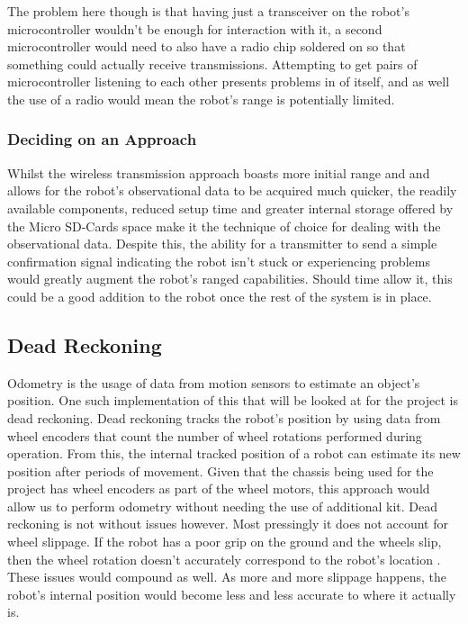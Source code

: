 					The problem here though is that having just a transceiver on the robot's microcontroller wouldn't be enough for interaction with it, a second microcontroller would need to also have a radio chip soldered on so that something could actually receive transmissions. Attempting to get pairs of microcontroller listening to each other presents problems in of itself, and as well the use of a radio would mean the robot's range is potentially limited.
					
					\subsubsection{Deciding on an Approach}
					Whilst the wireless transmission approach boasts more initial range and and allows for the robot's observational data to be acquired much quicker, the readily available components, reduced setup time and greater internal storage offered by the Micro SD-Cards space make it the technique of choice for dealing with the observational data. Despite this, the ability for a transmitter to send a simple confirmation signal indicating the robot isn't stuck or experiencing problems would greatly augment the robot's ranged capabilities. Should time allow it, this could be a good addition to the robot once the rest of the system is in place.
				
				\subsection{Dead Reckoning}
				Odometry is the usage of data from motion sensors to estimate an object's position. One such implementation of this that will be looked at for the project is dead reckoning. Dead reckoning tracks the robot's position by using data from wheel encoders that count the number of wheel rotations performed during operation. From this, the internal tracked position of a robot can estimate its new position after periods of movement. Given that the chassis being used for the project has wheel encoders as part of the wheel motors, this approach would allow us to perform odometry without needing the use of additional kit. Dead reckoning is not without issues however. Most pressingly it does not account for wheel slippage. If the robot has a poor grip on the ground and the wheels slip, then the wheel rotation doesn't accurately correspond to the robot's location \citep{choset2001topological}. These issues would compound as well. As more and more slippage happens, the robot's internal position would become less and less accurate to where it actually is. 
				
